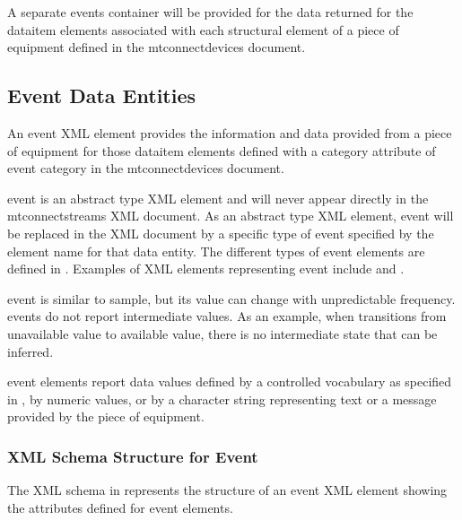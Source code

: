 A separate \gls{events} container will be provided for the data returned for the \gls{dataitem} elements associated with each \gls{structural element} of a piece of equipment defined in the \gls{mtconnectdevices} document.




\subsection{Event Data Entities}

An \gls{event} XML element provides the information and data provided from a piece of equipment for those \gls{dataitem} elements defined with a \gls{category} attribute of \gls{event category} in the \gls{mtconnectdevices} document.

\gls{event} is an abstract \gls{type} XML element and will never appear directly in the \gls{mtconnectstreams} XML document.  As an abstract \gls{type} XML element, \gls{event} will be replaced in the XML document by a specific \gls{type} of \gls{event} specified by the \gls{element name} for that \gls{data entity}.  The different \glspl{type} of \gls{event} elements are defined in .  Examples of XML elements representing \gls{event} include  and .

\gls{event} is similar to \gls{sample}, but its value can change with unpredictable frequency.  \gls{events} do not report intermediate values.  As an example, when  transitions from \gls{unavailable value} to \gls{available value}, there is no intermediate state that can be inferred.

\gls{event} elements \may report data values defined by a controlled vocabulary as specified in , by numeric values, or by a character string representing text or a message provided by the piece of equipment. 




\subsubsection{XML Schema Structure for Event}

The XML schema in  represents the structure of an \gls{event} XML element showing the attributes defined for \gls{event} elements.

